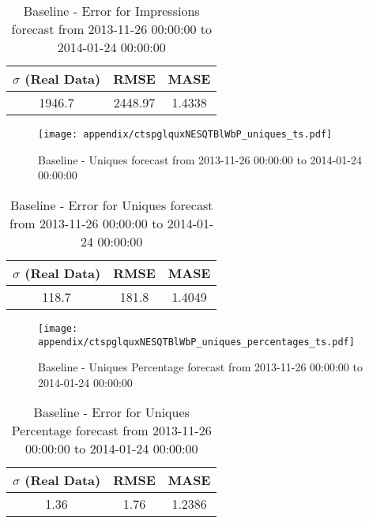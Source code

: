 \begin{table}[H]
\centering
\footnotesize
\begin{tabular}{ccc}
$\sigma$ (Real Data) & RMSE & MASE   \\ \hline
1946.7 & 2448.97 & 1.4338 \\
\end{tabular}

\vspace{0.5cm}

\caption{
Baseline - Error for Impressions forecast from 2013-11-26 00:00:00 to 2014-01-24 00:00:00}
\end{table}

\begin{figure}[H] \begin{center} \leavevmode
\texttt{[image: appendix/ctspglquxNESQTBlWbP\_uniques\_ts.pdf]} \caption{
Baseline - Uniques forecast from 2013-11-26 00:00:00 to 2014-01-24 00:00:00} \label{fig:appendix/ctspglquxNESQTBlWbP_uniques_ts.pdf} \end{center}
\end{figure}

\begin{table}[H]
\centering
\footnotesize
\begin{tabular}{ccc}
$\sigma$ (Real Data) & RMSE & MASE   \\ \hline
118.7 & 181.8 & 1.4049 \\
\end{tabular}

\vspace{0.5cm}

\caption{
Baseline - Error for Uniques forecast from 2013-11-26 00:00:00 to 2014-01-24 00:00:00}
\end{table}

\begin{figure}[H] \begin{center} \leavevmode
\texttt{[image: appendix/ctspglquxNESQTBlWbP\_uniques\_percentages\_ts.pdf]} \caption{
Baseline - Uniques Percentage forecast from 2013-11-26 00:00:00 to 2014-01-24 00:00:00} \label{fig:appendix/ctspglquxNESQTBlWbP_uniques_percentages_ts.pdf} \end{center}
\end{figure}

\begin{table}[H]
\centering
\footnotesize
\begin{tabular}{ccc}
$\sigma$ (Real Data) & RMSE & MASE   \\ \hline
1.36 & 1.76 & 1.2386 \\
\end{tabular}

\vspace{0.5cm}

\caption{
Baseline - Error for Uniques Percentage forecast from 2013-11-26 00:00:00 to 2014-01-24 00:00:00}
\end{table}

